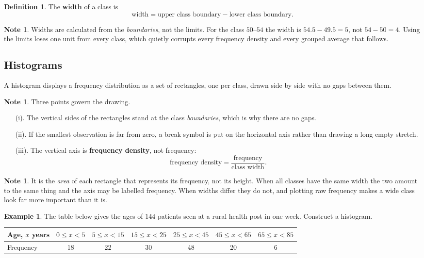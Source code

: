 \documentclass[11pt,a4paper]{article}
\theoremstyle{definition}
\newtheorem{definition}[thm]{Definition}
\newtheorem{example}[thm]{Example}
\newtheorem{note}[thm]{Note}
\begin{document}
\begin{definition}
The \textbf{width} of a class is
$$\text{width}=\text{upper class boundary}-\text{lower class boundary}.$$
\end{definition}

\begin{note}
Widths are calculated from the \emph{boundaries}, not the limits. For the class
$50$--$54$ the width is $54.5-49.5=5$, not $54-50=4$. Using the limits loses one unit
from every class, which quietly corrupts every frequency density and every grouped
average that follows.
\end{note}

\subsection{Histograms}

A histogram displays a frequency distribution as a set of rectangles, one per class,
drawn side by side with no gaps between them.

\begin{note}
Three points govern the drawing.
\begin{enumerate}
\item[(i).] The vertical sides of the rectangles stand at the class \emph{boundaries},
which is why there are no gaps.
\item[(ii).] If the smallest observation is far from zero, a break symbol is put on the
horizontal axis rather than drawing a long empty stretch.
\item[(iii).] The vertical axis is \textbf{frequency density}, not frequency:
$$\text{frequency density}=\frac{\text{frequency}}{\text{class width}}.$$
\end{enumerate}
\end{note}

\begin{note}
It is the \emph{area} of each rectangle that represents its frequency, not its height.
When all classes have the same width the two amount to the same thing and the axis may
be labelled frequency. When widths differ they do not, and plotting raw frequency makes
a wide class look far more important than it is.
\end{note}

\begin{example}
The table below gives the ages of $144$ patients seen at a rural health post in one
week. Construct a histogram.

\begin{table}[H]
\centering
\begin{tabular}{|l|c|c|c|c|c|c|}
\hline
Age, $x$ years & $0\leq x<5$ & $5\leq x<15$ & $15\leq x<25$ & $25\leq x<45$ &
$45\leq x<65$ & $65\leq x<85$\\
\hline
Frequency & 18 & 22 & 30 & 48 & 20 & 6\\
\hline
\end{tabular}
\end{table}
\end{example}
\end{document}
